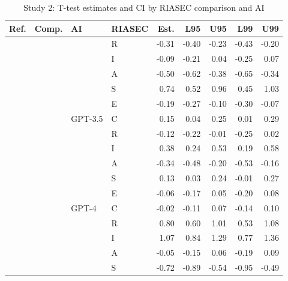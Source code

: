 \begin{table}

\caption{Study 2: T-test estimates and CI by RIASEC comparison and AI}
\centering
\fontsize{8}{10}\selectfont
\begin{tabular}[t]{llllrrrrr}
\toprule
Ref. & Comp. & AI & RIASEC & Est. & L95 & U95 & L99 & U99\\
\midrule
 &  &  & R & -0.31 & -0.40 & -0.23 & -0.43 & -0.20\\

 &  &  & I & -0.09 & -0.21 & 0.04 & -0.25 & 0.07\\

 &  &  & A & -0.50 & -0.62 & -0.38 & -0.65 & -0.34\\

 &  &  & S & 0.74 & 0.52 & 0.96 & 0.45 & 1.03\\

 &  &  & E & -0.19 & -0.27 & -0.10 & -0.30 & -0.07\\

 &  & \multirow[t]{-6}{*}{\raggedright\arraybackslash GPT-3.5} & C & 0.15 & 0.04 & 0.25 & 0.01 & 0.29\\

 &  &  & R & -0.12 & -0.22 & -0.01 & -0.25 & 0.02\\

 &  &  & I & 0.38 & 0.24 & 0.53 & 0.19 & 0.58\\

 &  &  & A & -0.34 & -0.48 & -0.20 & -0.53 & -0.16\\

 &  &  & S & 0.13 & 0.03 & 0.24 & -0.01 & 0.27\\

 &  &  & E & -0.06 & -0.17 & 0.05 & -0.20 & 0.08\\

 &  & \multirow[t]{-6}{*}{\raggedright\arraybackslash GPT-4} & C & -0.02 & -0.11 & 0.07 & -0.14 & 0.10\\

 &  &  & R & 0.80 & 0.60 & 1.01 & 0.53 & 1.08\\

 &  &  & I & 1.07 & 0.84 & 1.29 & 0.77 & 1.36\\

 &  &  & A & -0.05 & -0.15 & 0.06 & -0.19 & 0.09\\

 &  &  & S & -0.72 & -0.89 & -0.54 & -0.95 & -0.49\\


\end{tabular}
\end{table}
